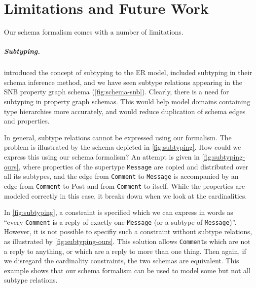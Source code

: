\documentclass{report}
\theoremstyle{definition}
\begin{document}
\chapter{Limitations and Future Work}
\label{ch:limitations}

Our schema formalism comes with a number of limitations.

\paragraph{Subtyping.} \citet{barker1990entity} introduced the concept of subtyping to the ER model, \citet{lbath2021inference} included subtyping in their schema inference method, and we have seen subtype relations appearing in the SNB property graph schema (\autoref{fig:schema-snb}). Clearly, there is a need for subtyping in property graph schemas. This would help model domains containing type hierarchies more accurately, and would reduce duplication of schema edges and properties.

In general, subtype relations cannot be expressed using our formalism. The problem is illustrated by the schema depicted in \autoref{fig:subtyping}. How could we express this using our schema formalism? An attempt is given in \autoref{fig:subtyping-ours}, where properties of the supertype \texttt{Message} are copied and distributed over all its subtypes, and the edge from \texttt{Comment} to \texttt{Message} is accompanied by an edge from \texttt{Comment} to Post and from \texttt{Comment} to itself. While the properties are modeled correctly in this case, it breaks down when we look at the cardinalities.

In \autoref{fig:subtyping}, a constraint is specified which we can express in words as ``every \texttt{Comment} is a reply of exactly one \texttt{Message} (or a subtype of \texttt{Message})''. However, it is not possible to specifiy such a constraint without subtype relations, as illustrated by \autoref{fig:subtyping-ours}. This solution allows \texttt{Comment}s which are not a reply to anything, or which are a reply to more than one thing. Then again, if we disregard the cardinality constraints, the two schemas are equivalent. This example shows that our schema formalism can be used to model some but not all subtype relations.
\end{document}
